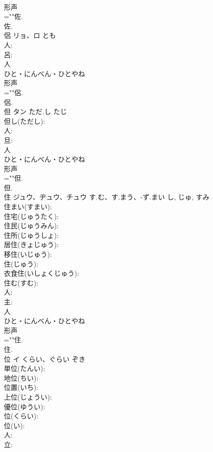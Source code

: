 \documentclass[8pt]{extreport}
\begin{document}
\begin{CJK}{UTF8}{min}
\\	形声 
\\	=""佐.
\\	佐.
\\	侶	リョ、ロ	とも		
\\	人: 
\\	呂: 
\\	人	
\\	ひと・にんべん・ひとやね	
\\	形声 
\\	=""侶.
\\	侶.
\\	但	タン	ただ.し	たじ	
\\	但し(ただし): 
\\	人: 
\\	旦: 
\\	人	
\\	ひと・にんべん・ひとやね	
\\	形声 
\\	=""但.
\\	但.
\\	住	ジュウ、ヂュウ、チュウ	す.む、す.まう、-ず.まい	し, じゅ, すみ	
\\	住まい(すまい): 
\\	住宅(じゅうたく): 
\\	住民(じゅうみん): 
\\	住所(じゅうしょ): 
\\	居住(きょじゅう): 
\\	移住(いじゅう): 
\\	住(じゅう): 
\\	衣食住(いしょくじゅう): 
\\	住む(すむ): 
\\	人: 
\\	主: 
\\	人	
\\	ひと・にんべん・ひとやね	
\\	形声 
\\	=""住.
\\	住.
\\	位	イ	くらい、ぐらい	ぞき	
\\	単位(たんい): 
\\	地位(ちい): 
\\	位置(いち): 
\\	上位(じょうい): 
\\	優位(ゆうい): 
\\	位(くらい): 
\\	位(い): 
\\	人: 
\\	立: 

\end{CJK}
\end{document}
